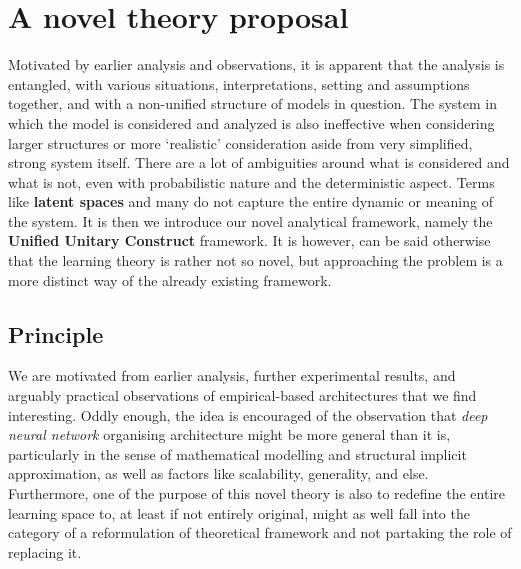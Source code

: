 \documentclass[10pt]{article}
\begin{document}
\clearpage

\section{A novel theory proposal}

Motivated by earlier analysis and observations, it is apparent that the analysis is entangled, with various situations, interpretations, setting and assumptions together, and with a non-unified structure of models in question. The system in which the model is considered and analyzed is also ineffective when considering larger structures or more `realistic' consideration aside from very simplified, strong system itself. There are a lot of ambiguities around what is considered and what is not, even with probabilistic nature and the deterministic aspect. Terms like \textbf{latent spaces} and many do not capture the entire dynamic or meaning of the system. It is then we introduce our novel analytical framework, namely the \textbf{Unified Unitary Construct} framework. It is however, can be said otherwise that the learning theory is rather not so novel, but approaching the problem is a more distinct way of the already existing framework. 

\subsection{Principle}

We are motivated from earlier analysis, further experimental results, and arguably practical observations of empirical-based architectures that we find interesting. Oddly enough, the idea is encouraged of the observation that \textit{deep neural network} organising architecture might be more general than it is, particularly in the sense of mathematical modelling and structural implicit approximation, as well as factors like scalability, generality, and else. Furthermore, one of the purpose of this novel theory is also to redefine the entire learning space to, at least if not entirely original, might as well fall into the category of a reformulation of theoretical framework and not partaking the role of replacing it. 
\end{document}
